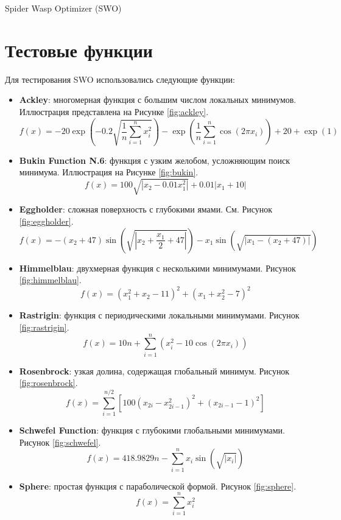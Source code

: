 \documentclass[a4paper,12pt]{article}
\begin{document}
\begin{algorithm}[H]
\caption{Spider Wasp Optimizer (SWO)}\label{alg:swo}
\end{algorithm}

\newpage

\section{Тестовые функции}
Для тестирования SWO использовались следующие функции:
\begin{itemize}
    \item \textbf{Ackley}: многомерная функция с большим числом локальных минимумов. Иллюстрация представлена на Рисунке \ref{fig:ackley}.
    \[
    f(x) = -20 \exp\left(-0.2 \sqrt{\frac{1}{n} \sum_{i=1}^{n} x_i^2}\right) - \exp\left(\frac{1}{n} \sum_{i=1}^{n} \cos(2\pi x_i)\right) + 20 + \exp(1)
    \]
    \item \textbf{Bukin Function N.6}: функция с узким желобом, усложняющим поиск минимума. Иллюстрация на Рисунке \ref{fig:bukin}.
    \[
    f(x) = 100 \sqrt{|x_2 - 0.01 x_1^2|} + 0.01 |x_1 + 10|
    \]
    \item \textbf{Eggholder}: сложная поверхность с глубокими ямами. См. Рисунок \ref{fig:eggholder}.
    \[
    f(x) = -(x_2 + 47) \sin\left(\sqrt{|x_2 + \frac{x_1}{2} + 47|}\right) - x_1 \sin\left(\sqrt{|x_1 - (x_2 + 47)|}\right)
    \]
    \item \textbf{Himmelblau}: двухмерная функция с несколькими минимумами. Рисунок \ref{fig:himmelblau}.
    \[
    f(x) = (x_1^2 + x_2 - 11)^2 + (x_1 + x_2^2 - 7)^2
    \]
    \item \textbf{Rastrigin}: функция с периодическими локальными минимумами. Рисунок \ref{fig:rastrigin}.
    \[
    f(x) = 10n + \sum_{i=1}^{n} (x_i^2 - 10 \cos(2\pi x_i))
    \]
    \item \textbf{Rosenbrock}: узкая долина, содержащая глобальный минимум. Рисунок \ref{fig:rosenbrock}.
    \[
    f(x) = \sum_{i=1}^{n/2} \left[100 (x_{2i} - x_{2i-1}^2)^2 + (x_{2i-1} - 1)^2\right]
    \]
    \item \textbf{Schwefel Function}: функция с глубокими глобальными минимумами. Рисунок \ref{fig:schwefel}.
    \[
    f(x) = 418.9829n - \sum_{i=1}^{n} x_i \sin(\sqrt{|x_i|})
    \]
    \item \textbf{Sphere}: простая функция с параболической формой. Рисунок \ref{fig:sphere}.
    \[
    f(x) = \sum_{i=1}^{n} x_i^2
    \]
\end{itemize}
\end{document}
